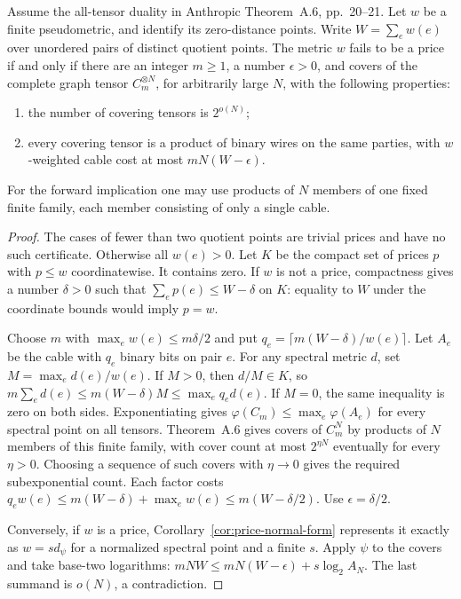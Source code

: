 \begin{proposition}
\label{rt:finite}
Assume the all-tensor duality in Anthropic Theorem~A.6, pp.~20--21.
Let $w$ be a finite pseudometric, and identify its zero-distance points.
Write $W=\sum_e w(e)$ over unordered pairs of distinct quotient points.
The metric $w$ fails to be a price if and only if there are an integer
$m\geq1$, a number $\epsilon>0$, and covers of the complete graph tensor
$C_m^{\otimes N}$, for arbitrarily large $N$, with the following properties:
\begin{enumerate}
\item the number of covering tensors is $2^{o(N)}$;
\item every covering tensor is a product of binary wires on the same
parties, with $w$-weighted cable cost at most $mN(W-\epsilon)$.
\end{enumerate}
For the forward implication one may use products of $N$ members of one
fixed finite family, each member consisting of only a single cable.
\end{proposition}
\begin{proof}
The cases of fewer than two quotient points are trivial prices and have
no such certificate. Otherwise all $w(e)>0$. Let $K$ be the compact set
of prices $p$ with $p\leq w$ coordinatewise. It contains zero. If $w$
is not a price, compactness gives a number $\delta>0$ such that
$\sum_e p(e)\leq W-\delta$ on $K$: equality to $W$ under the coordinate
bounds would imply $p=w$.

Choose $m$ with $\max_e w(e)\leq m\delta/2$ and put
$q_e=\lceil m(W-\delta)/w(e)\rceil$. Let $A_e$ be the cable with
$q_e$ binary bits on pair $e$. For any spectral metric $d$, set
$M=\max_e d(e)/w(e)$. If $M>0$, then $d/M\in K$, so
$m\sum_e d(e)\leq m(W-\delta)M\leq\max_e q_e d(e)$.
If $M=0$, the same inequality is zero on both sides. Exponentiating
gives $\varphi(C_m)\leq\max_e\varphi(A_e)$ for every spectral point
on all tensors. Theorem~A.6 gives covers of $C_m^N$ by products of
$N$ members of this finite family, with cover count at most $2^{\eta N}$
eventually for every $\eta>0$. Choosing a sequence of such covers with
$\eta\to0$ gives the required subexponential count. Each factor costs
$q_e w(e)\leq m(W-\delta)+\max_e w(e)\leq m(W-\delta/2)$.
Use $\epsilon=\delta/2$.

Conversely, if $w$ is a price, Corollary~\ref{cor:price-normal-form}
represents it exactly as $w=s d_\psi$ for a normalized spectral point
and a finite $s$. Apply $\psi$ to the covers and take base-two logarithms:
$mNW\leq mN(W-\epsilon)+s\log_2 A_N$.
The last summand is $o(N)$, a contradiction.
\end{proof}

